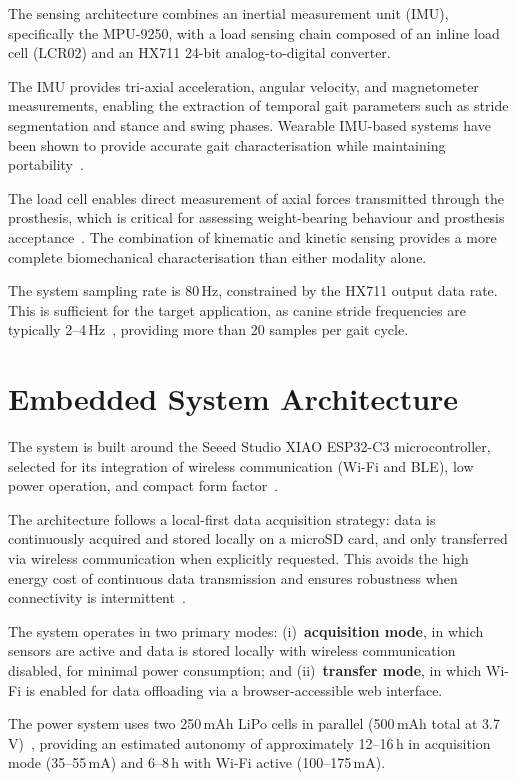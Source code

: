 The sensing architecture combines an inertial measurement unit (IMU),
specifically the MPU-9250, with a load sensing chain composed of an inline
load cell (LCR02) and an HX711 24-bit analog-to-digital converter.

The IMU provides tri-axial acceleration, angular velocity, and magnetometer
measurements, enabling the extraction of temporal gait parameters such as
stride segmentation and stance and swing phases.
Wearable IMU-based systems have been shown to provide accurate gait
characterisation while maintaining portability~\cite{Jenkins2018,Zhang2022}.

The load cell enables direct measurement of axial forces transmitted through
the prosthesis, which is critical for assessing weight-bearing behaviour and
prosthesis acceptance~\cite{McLaughlin2001,Budsberg1996}.
The combination of kinematic and kinetic sensing provides a more complete
biomechanical characterisation than either modality alone.

The system sampling rate is 80\,Hz, constrained by the HX711 output data rate.
This is sufficient for the target application, as canine stride frequencies are
typically 2--4\,Hz~\cite{Hayati2019,Jenkins2018}, providing more than 20
samples per gait cycle.

\section{Embedded System Architecture}

The system is built around the Seeed Studio XIAO ESP32-C3 microcontroller,
selected for its integration of wireless communication (Wi-Fi and BLE), low
power operation, and compact form factor~\cite{ESP32C3}.

The architecture follows a local-first data acquisition strategy: data is
continuously acquired and stored locally on a microSD card, and only
transferred via wireless communication when explicitly requested.
This avoids the high energy cost of continuous data transmission and ensures
robustness when connectivity is intermittent~\cite{Wang2019,Bulling2014}.

The system operates in two primary modes:
(i)~\textbf{acquisition mode}, in which sensors are active and data is
stored locally with wireless communication disabled, for minimal power
consumption; and
(ii)~\textbf{transfer mode}, in which Wi-Fi is enabled for data offloading
via a browser-accessible web interface.

The power system uses two 250\,mAh LiPo cells in parallel (500\,mAh total
at 3.7\,V)~\cite{LiPo250mAh}, providing an estimated autonomy of approximately
12--16\,h in acquisition mode (35--55\,mA) and 6--8\,h with Wi-Fi active
(100--175\,mA).

